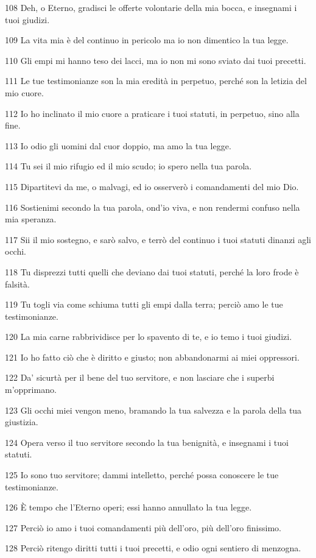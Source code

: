 \par 108 Deh, o Eterno, gradisci le offerte volontarie della mia bocca, e insegnami i tuoi giudizi.
\par 109 La vita mia è del continuo in pericolo ma io non dimentico la tua legge.
\par 110 Gli empi mi hanno teso dei lacci, ma io non mi sono sviato dai tuoi precetti.
\par 111 Le tue testimonianze son la mia eredità in perpetuo, perché son la letizia del mio cuore.
\par 112 Io ho inclinato il mio cuore a praticare i tuoi statuti, in perpetuo, sino alla fine.
\par 113 Io odio gli uomini dal cuor doppio, ma amo la tua legge.
\par 114 Tu sei il mio rifugio ed il mio scudo; io spero nella tua parola.
\par 115 Dipartitevi da me, o malvagi, ed io osserverò i comandamenti del mio Dio.
\par 116 Sostienimi secondo la tua parola, ond'io viva, e non rendermi confuso nella mia speranza.
\par 117 Sii il mio sostegno, e sarò salvo, e terrò del continuo i tuoi statuti dinanzi agli occhi.
\par 118 Tu disprezzi tutti quelli che deviano dai tuoi statuti, perché la loro frode è falsità.
\par 119 Tu togli via come schiuma tutti gli empi dalla terra; perciò amo le tue testimonianze.
\par 120 La mia carne rabbrividisce per lo spavento di te, e io temo i tuoi giudizi.
\par 121 Io ho fatto ciò che è diritto e giusto; non abbandonarmi ai miei oppressori.
\par 122 Da' sicurtà per il bene del tuo servitore, e non lasciare che i superbi m'opprimano.
\par 123 Gli occhi miei vengon meno, bramando la tua salvezza e la parola della tua giustizia.
\par 124 Opera verso il tuo servitore secondo la tua benignità, e insegnami i tuoi statuti.
\par 125 Io sono tuo servitore; dammi intelletto, perché possa conoscere le tue testimonianze.
\par 126 È tempo che l'Eterno operi; essi hanno annullato la tua legge.
\par 127 Perciò io amo i tuoi comandamenti più dell'oro, più dell'oro finissimo.
\par 128 Perciò ritengo diritti tutti i tuoi precetti, e odio ogni sentiero di menzogna.
